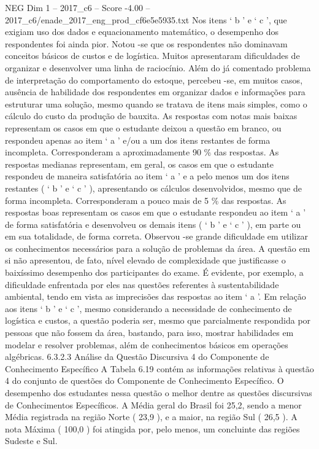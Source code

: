 \begin{textsample}{NEG Dim 1 – 2017\_c6 – Score -4.00 – 2017\_c6/enade\_2017\_eng\_prod\_cf6e5e5935.txt}
Nos itens ‘ b ’ e ‘ c ’, que exigiam uso dos dados e equacionamento matemático, o desempenho dos respondentes foi ainda pior.
Notou -se que os respondentes não dominavam conceitos básicos de custos e de logística.
Muitos apresentaram dificuldades de organizar e desenvolver uma linha de raciocínio.
Além do já comentado problema de interpretação do comportamento do estoque, percebeu -se, em muitos casos, ausência de habilidade dos respondentes em organizar dados e informações para estruturar uma solução, mesmo quando se tratava de itens mais simples, como o cálculo do custo da produção de bauxita.
As respostas com notas mais baixas representam os casos em que o estudante deixou a questão em branco, ou respondeu apenas ao item ‘ a ’ e/ou a um dos itens restantes de forma incompleta.
Corresponderam a aproximadamente 90 \% das respostas.
As respostas medianas representam, em geral, os casos em que o estudante respondeu de maneira satisfatória ao item ‘ a ’ e a pelo menos um dos itens restantes ( ‘ b ’ e ‘ c ’ ), apresentando os cálculos desenvolvidos, mesmo que de forma incompleta.
Corresponderam a pouco mais de 5 \% das respostas.
As respostas boas representam os casos em que o estudante respondeu ao item ‘ a ’ de forma satisfatória e desenvolveu os demais itens ( ‘ b ’ e ‘ c ’ ), em parte ou em sua totalidade, de forma correta.
Observou -se grande dificuldade em utilizar os conhecimentos necessários para a solução de problemas da área.
A questão em si não apresentou, de fato, nível elevado de complexidade que justificasse o baixíssimo desempenho dos participantes do exame.
É evidente, por exemplo, a dificuldade enfrentada por eles nas questões referentes à sustentabilidade ambiental, tendo em vista as imprecisões das respostas ao item ‘ a ’.
Em relação aos itens ‘ b ’ e ‘ c ’, mesmo considerando a necessidade de conhecimento de logística e custos, a questão poderia ser, mesmo que parcialmente respondida por pessoas que não fossem da área, bastando, para isso, mostrar habilidades em modelar e resolver problemas, além de conhecimentos básicos em operações algébricas. 6.3.2.3 Análise da Questão Discursiva 4 do Componente de Conhecimento Específico A Tabela 6.19 contém as informações relativas à questão 4 do conjunto de questões do Componente de Conhecimento Específico.
O desempenho dos estudantes nessa questão o melhor dentre as questões discursivas de Conhecimentos Específicos.
A Média geral do Brasil foi 25,2, sendo a menor Média registrada na região Norte ( 23,9 ), e a maior, na região Sul ( 26,5 ).
A nota Máxima ( 100,0 ) foi atingida por, pelo menos, um concluinte das regiões Sudeste e Sul.

\end{textsample}

